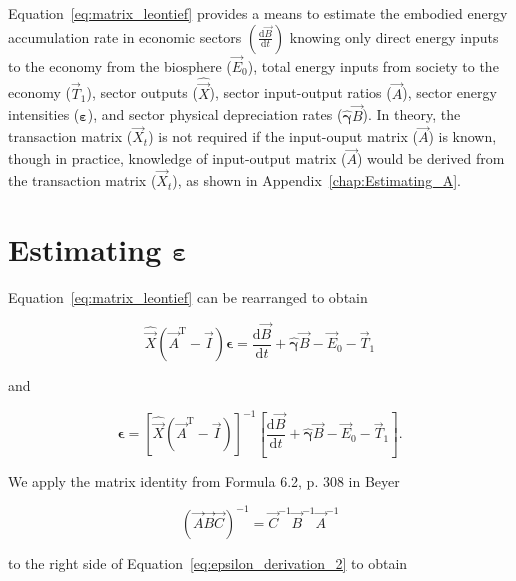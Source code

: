Equation~\ref{eq:matrix_leontief} provides a means to 
estimate the embodied energy accumulation rate
in economic sectors $\left(\frac{\mathrm{d}\vec{B}}{\mathrm{d}t}\right)$ 
knowing only 
direct energy inputs to the economy from the biosphere ($\vec{E}_{0}$), 
total energy inputs from society to the economy ($\vec{T}_{1}$),
sector outputs ($\hat{\vec{X}}$), 
sector input-output ratios ($\vec{A}$), 
sector energy intensities ($\bm{\varepsilon}$), 
and sector physical depreciation rates ($\hat{\bm{\gamma}}\vec{B}$). 
In theory, the transaction matrix ($\vec{X}_{t}$) is not required 
if the input-ouput matrix ($\vec{A}$) is known, 
though in practice, 
knowledge of input-output matrix ($\vec{A}$) 
would be derived from the transaction matrix ($\vec{X}_{t}$),
as shown in Appendix~\ref{chap:Estimating_A}.


\section{Estimating $\bm{\varepsilon}$}
\label{sec:estimating_epsilon-intensity_chapter}

Equation~\ref{eq:matrix_leontief} can be rearranged to obtain

\begin{equation} \label{eq:epsilon_derivation_1}
	\hat{\vec{X}} (\vec{A}^{\mathrm{T}} - \vec{I}) \bm{\epsilon}
	= \frac{\mathrm{d}\vec{B}}{\mathrm{d}t}
	+ \hat{\bm{\gamma}} \vec{B}
	- \vec{E}_{0}
	- \vec{T}_{1} 
\end{equation}

\noindent{}and

\begin{equation} \label{eq:epsilon_derivation_2}
	\bm{\epsilon}
	= {\left[ \hat{\vec{X}} (\vec{A}^{\mathrm{T}} - \vec{I}) \right]}^{-1}
		\left[
			\frac{\mathrm{d}\vec{B}}{\mathrm{d}t}
			+ \hat{\bm{\gamma}} \vec{B}
			- \vec{E}_{0}
			- \vec{T}_{1} 
		\right].
\end{equation}

\noindent{}We apply the matrix identity 
from Formula 6.2, p. 308 in Beyer~\cite{Beyer:1991vd}

\begin{equation} \label{eq:matrix_identity_Beyer}
	{\left(\vec{A}\vec{B}\vec{C}\right)}^{-1} 
	= \vec{C}^{-1} \vec{B}^{-1} \vec{A}^{-1}
\end{equation}

\noindent{}to the right side of Equation~\ref{eq:epsilon_derivation_2} to obtain

